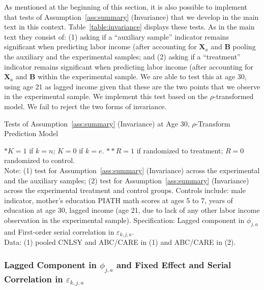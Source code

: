 \noindent As mentioned at the beginning of this section, it is also possible to implement that tests of Assumption~\ref{ass:summary} (Invariance)  that we develop in the main text in this context. Table~\ref{table:invariance} displays these tests. As in the main text they consist of: (1) asking if a ``auxiliary sample'' indicator remains significant when predicting labor income (after accounting for $\bm{X}_{a}$ and $\bm{B}$ pooling the auxiliary and the experimental samples; and (2) asking if a ``treatment'' indicator remains significant when predicting labor income (after accounting for $\bm{X}_{a}$ and $\bm{B}$ within the experimental sample. We are able to test this at age 30, using age 21 as lagged income given that these are the two points that we observe in the experimental sample. We implement this test based on the $\rho$-transformed model. We fail to reject the two forms of invariance.\\

\begin{table}[H] 
\begin{threeparttable}
\caption{Tests of Assumption~\ref{ass:summary} (Invariance) at Age 30, $\rho$-Transform Prediction Model}
\label{table:invariance}
\centering 

\end{threeparttable}
\end{table}
\begin{spacing}{1}
\begin{footnotesize}
\noindent $* K= 1$ if $k = n$; $K = 0$ if $k = e$. $** R= 1$ if randomized to treatment; $R = 0$ randomized to control. \\ 
\noindent Note: (1) test for Assumption~\ref{ass:summary} (Invariance) across the experimental and the auxiliary samples; (2) test for Assumption~\ref{ass:summary} (Invariance) across the experimental treatment and control groups. Controls include: male indicator, mother's education PIATH math scores at ages 5 to 7, years of education at age 30, lagged income (age 21, due to lack of any other labor income observation in the experimental sample).
\noindent Specification: Lagged component in $\phi_{j,a}$ and First-order serial correlation in $\varepsilon_{k,j,a}$.\\ 
\noindent Data: (1) pooled CNLSY and ABC/CARE in (1) and ABC/CARE in (2). 
\end{footnotesize}
\end{spacing}

\subsubsection{Lagged Component in $\phi_{j,a}$ and Fixed Effect and Serial Correlation in $\varepsilon_{k,j,a}$}

